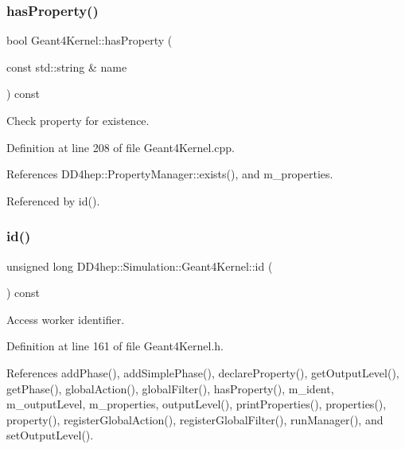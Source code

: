 \subsubsection{\texorpdfstring{has\+Property()}{hasProperty()}}
{\footnotesize\ttfamily bool Geant4\+Kernel\+::has\+Property (\begin{DoxyParamCaption}\item[{const std\+::string \&}]{name }\end{DoxyParamCaption}) const}



Check property for existence. 



Definition at line 208 of file Geant4\+Kernel.\+cpp.



References D\+D4hep\+::\+Property\+Manager\+::exists(), and m\+\_\+properties.



Referenced by id().

\hypertarget{class_d_d4hep_1_1_simulation_1_1_geant4_kernel_a65e6428708ccaa9e0c4545b57437246d}{}\label{class_d_d4hep_1_1_simulation_1_1_geant4_kernel_a65e6428708ccaa9e0c4545b57437246d} 
\subsubsection{\texorpdfstring{id()}{id()}}
{\footnotesize\ttfamily unsigned long D\+D4hep\+::\+Simulation\+::\+Geant4\+Kernel\+::id (\begin{DoxyParamCaption}{ }\end{DoxyParamCaption}) const\hspace{0.3cm}{\ttfamily [inline]}}



Access worker identifier. 



Definition at line 161 of file Geant4\+Kernel.\+h.



References add\+Phase(), add\+Simple\+Phase(), declare\+Property(), get\+Output\+Level(), get\+Phase(), global\+Action(), global\+Filter(), has\+Property(), m\+\_\+ident, m\+\_\+output\+Level, m\+\_\+properties, output\+Level(), print\+Properties(), properties(), property(), register\+Global\+Action(), register\+Global\+Filter(), run\+Manager(), and set\+Output\+Level().



